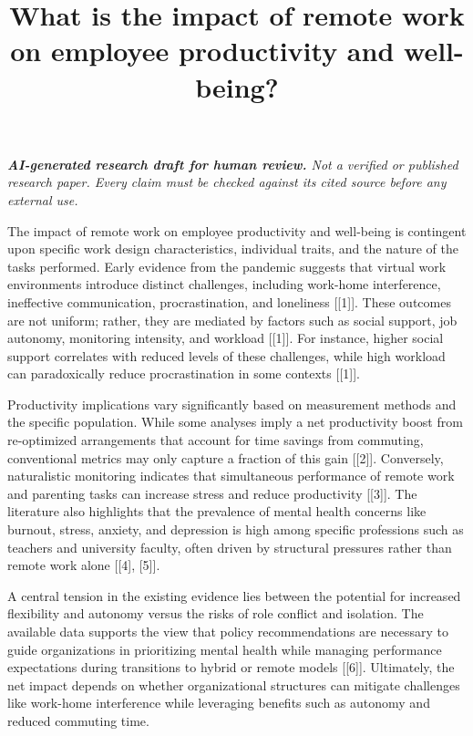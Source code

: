 \documentclass[11pt]{article}
\title{What is the impact of remote work on employee productivity and well-being?}
\date{}
\begin{document}
\maketitle
\textit{\textbf{AI-generated research draft for human review.} Not a verified or published research paper. Every claim must be checked against its cited source before any external use.}\par

The impact of remote work on employee productivity and well-being is contingent upon specific work design characteristics, individual traits, and the nature of the tasks performed. Early evidence from the pandemic suggests that virtual work environments introduce distinct challenges, including work-home interference, ineffective communication, procrastination, and loneliness [[1]]. These outcomes are not uniform; rather, they are mediated by factors such as social support, job autonomy, monitoring intensity, and workload [[1]]. For instance, higher social support correlates with reduced levels of these challenges, while high workload can paradoxically reduce procrastination in some contexts [[1]].

Productivity implications vary significantly based on measurement methods and the specific population. While some analyses imply a net productivity boost from re-optimized arrangements that account for time savings from commuting, conventional metrics may only capture a fraction of this gain [[2]]. Conversely, naturalistic monitoring indicates that simultaneous performance of remote work and parenting tasks can increase stress and reduce productivity [[3]]. The literature also highlights that the prevalence of mental health concerns like burnout, stress, anxiety, and depression is high among specific professions such as teachers and university faculty, often driven by structural pressures rather than remote work alone [[4], [5]].

A central tension in the existing evidence lies between the potential for increased flexibility and autonomy versus the risks of role conflict and isolation. The available data supports the view that policy recommendations are necessary to guide organizations in prioritizing mental health while managing performance expectations during transitions to hybrid or remote models [[6]]. Ultimately, the net impact depends on whether organizational structures can mitigate challenges like work-home interference while leveraging benefits such as autonomy and reduced commuting time.
\end{document}
